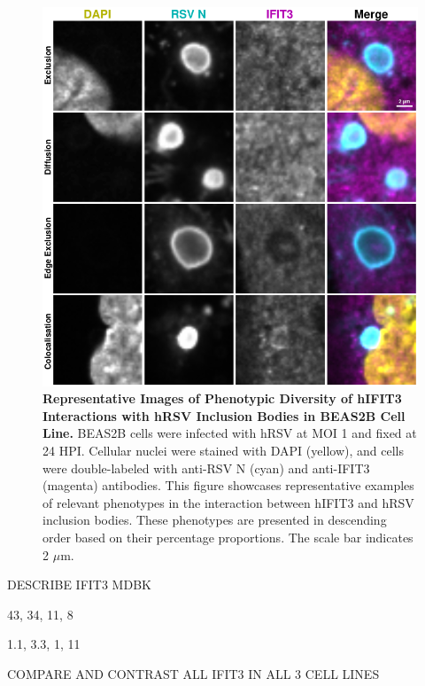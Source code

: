 \begin{figure}
    \centering
    \includegraphics[width=1\linewidth]{08. Chapter 3/Figs/02. Infection/03. IFIT3/06. beas2b i3.pdf}
    \caption[Representative Images of Phenotypic Diversity of hIFIT3 Interactions with hRSV Inclusion Bodies in BEAS2B Cell Line]{\textbf{Representative Images of Phenotypic Diversity of hIFIT3 Interactions with hRSV Inclusion Bodies in BEAS2B Cell Line.} BEAS2B cells were infected with hRSV at MOI 1 and fixed at 24 HPI. Cellular nuclei were stained with DAPI (yellow), and cells were double-labeled with anti-RSV N (cyan) and anti-IFIT3 (magenta) antibodies. This figure showcases representative examples of relevant phenotypes in the interaction between hIFIT3 and hRSV inclusion bodies. These phenotypes are presented in descending order based on their percentage proportions. The scale bar indicates 2 \(\mu \mbox{m}\).}
    \label{fig:Representative Images of Phenotypic Diversity of hIFIT3 Interactions with hRSV Inclusion Bodies in BEAS2B Cell Line}
\end{figure}

DESCRIBE IFIT3 MDBK

43, 34, 11, 8

1.1, 3.3, 1, 11

COMPARE AND CONTRAST ALL IFIT3 IN ALL 3 CELL LINES

